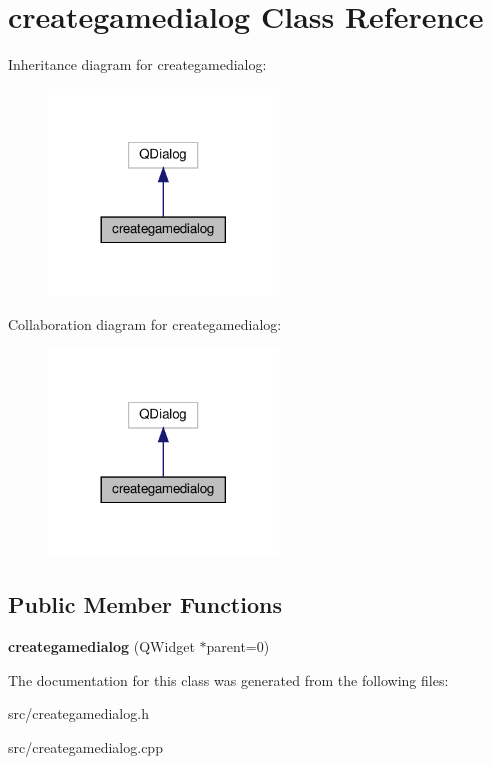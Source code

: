 \hypertarget{classcreategamedialog}{}\section{creategamedialog Class Reference}
\label{classcreategamedialog}


Inheritance diagram for creategamedialog\+:\nopagebreak
\begin{figure}[H]
\begin{center}
\leavevmode
\includegraphics[width=173pt]{classcreategamedialog__inherit__graph}
\end{center}
\end{figure}


Collaboration diagram for creategamedialog\+:\nopagebreak
\begin{figure}[H]
\begin{center}
\leavevmode
\includegraphics[width=173pt]{classcreategamedialog__coll__graph}
\end{center}
\end{figure}
\subsection*{Public Member Functions}
\begin{DoxyCompactItemize}
\item 
\mbox{\label{classcreategamedialog_afb6ad2b9afb5d99b111bc0aeb32fcca6}} 
{\bfseries creategamedialog} (Q\+Widget $\ast$parent=0)
\end{DoxyCompactItemize}


The documentation for this class was generated from the following files\+:\begin{DoxyCompactItemize}
\item 
src/creategamedialog.\+h\item 
src/creategamedialog.\+cpp\end{DoxyCompactItemize}
